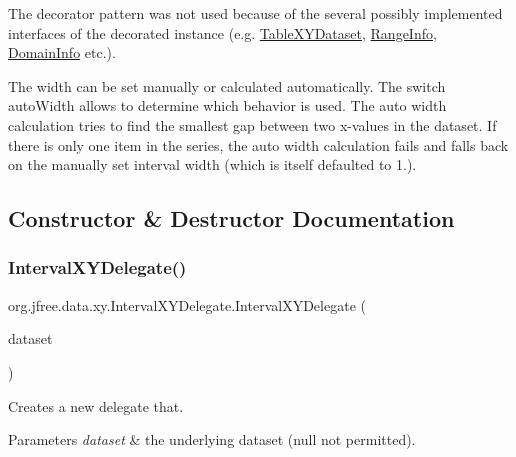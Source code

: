 The decorator pattern was not used because of the several possibly implemented interfaces of the decorated instance (e.\+g. \mbox{\hyperlink{interfaceorg_1_1jfree_1_1data_1_1xy_1_1_table_x_y_dataset}{Table\+X\+Y\+Dataset}}, \mbox{\hyperlink{interfaceorg_1_1jfree_1_1data_1_1_range_info}{Range\+Info}}, \mbox{\hyperlink{interfaceorg_1_1jfree_1_1data_1_1_domain_info}{Domain\+Info}} etc.). 

The width can be set manually or calculated automatically. The switch auto\+Width allows to determine which behavior is used. The auto width calculation tries to find the smallest gap between two x-\/values in the dataset. If there is only one item in the series, the auto width calculation fails and falls back on the manually set interval width (which is itself defaulted to 1.). 

\subsection{Constructor \& Destructor Documentation}
\mbox{\label{classorg_1_1jfree_1_1data_1_1xy_1_1_interval_x_y_delegate_a613e04f9c0fae1009e4b7c78223815d4}} 
\subsubsection{\texorpdfstring{Interval\+X\+Y\+Delegate()}{IntervalXYDelegate()}\hspace{0.1cm}{\footnotesize\ttfamily [1/2]}}
{\footnotesize\ttfamily org.\+jfree.\+data.\+xy.\+Interval\+X\+Y\+Delegate.\+Interval\+X\+Y\+Delegate (\begin{DoxyParamCaption}\item[{\mbox{\hyperlink{interfaceorg_1_1jfree_1_1data_1_1xy_1_1_x_y_dataset}{X\+Y\+Dataset}}}]{dataset }\end{DoxyParamCaption})}

Creates a new delegate that.


\begin{DoxyParams}{Parameters}
{\em dataset} & the underlying dataset ({\ttfamily null} not permitted). \\
\hline
\end{DoxyParams}
\mbox{\label{classorg_1_1jfree_1_1data_1_1xy_1_1_interval_x_y_delegate_aac91ba9da5d88f3a4269f9c381c42a58}} 
